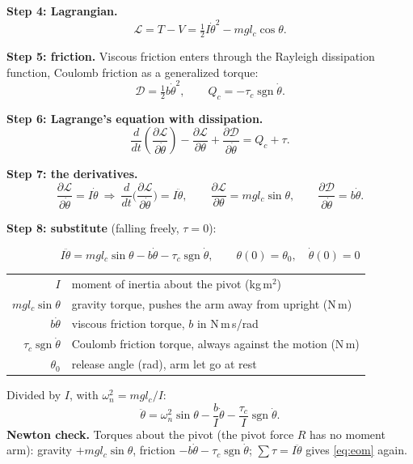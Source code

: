 \documentclass[11pt]{article}
\makeatletter
\newcommand{\sgn}{\operatorname{sgn}}
\newcommand{\Lag}{\mathcal{L}}
\newcommand{\Ray}{\mathcal{D}}
\newcommand{\where}[1]{\par\vspace{-2pt}{\small\color{muted}\textit{where}}\par\vspace{-2pt}
  {\small\renewcommand{\arraystretch}{1.08}\begin{tabular}{@{}>{$}r<{$}@{\;\;}l@{}}#1\end{tabular}}}
\makeatother
\begin{document}
\textbf{Step 4: Lagrangian.}
\begin{equation}
\Lag = T - V = \tfrac12 I\dot\theta^2 - m g l_c\cos\theta .
\end{equation}

\textbf{Step 5: friction.} Viscous friction enters through the Rayleigh dissipation function, Coulomb friction as a generalized torque:
\begin{equation}
\Ray=\tfrac12 b\dot\theta^2,\qquad Q_c=-\tau_c\sgn\dot\theta .
\end{equation}

\textbf{Step 6: Lagrange's equation with dissipation.}
\begin{equation}
\frac{d}{dt}\!\left(\frac{\partial\Lag}{\partial\dot\theta}\right)-\frac{\partial\Lag}{\partial\theta}+\frac{\partial\Ray}{\partial\dot\theta}=Q_c+\tau .
\end{equation}

\textbf{Step 7: the derivatives.}
\begin{equation}
\frac{\partial\Lag}{\partial\dot\theta}=I\dot\theta\ \Rightarrow\ \frac{d}{dt}\Big(\frac{\partial\Lag}{\partial\dot\theta}\Big)=I\ddot\theta,\qquad
\frac{\partial\Lag}{\partial\theta}=m g l_c\sin\theta,\qquad
\frac{\partial\Ray}{\partial\dot\theta}=b\dot\theta .
\end{equation}

\textbf{Step 8: substitute} (falling freely, $\tau=0$):
\begin{result}[title={Equation of motion}]
\begin{equation}
I\ddot\theta = m g l_c\sin\theta - b\dot\theta - \tau_c\sgn\dot\theta,\qquad \theta(0)=\theta_0,\quad \dot\theta(0)=0 \label{eq:eom}
\end{equation}
\where{I & moment of inertia about the pivot (kg\,m$^2$)\\ m g l_c\sin\theta & gravity torque, pushes the arm away from upright (N\,m)\\ b\dot\theta & viscous friction torque, $b$ in N\,m\,s/rad\\ \tau_c\sgn\dot\theta & Coulomb friction torque, always against the motion (N\,m)\\ \theta_0 & release angle (rad), arm let go at rest}
\end{result}
Divided by $I$, with $\omega_n^2=m g l_c/I$:
\begin{equation}
\ddot\theta=\omega_n^2\sin\theta-\frac{b}{I}\dot\theta-\frac{\tau_c}{I}\sgn\dot\theta . \label{eq:eomI}
\end{equation}
\textbf{Newton check.} Torques about the pivot (the pivot force $R$ has no moment arm): gravity $+m g l_c\sin\theta$, friction $-b\dot\theta-\tau_c\sgn\dot\theta$; $\sum\tau = I\ddot\theta$ gives \eqref{eq:eom} again.
\end{document}
